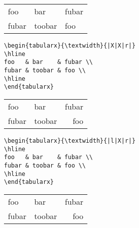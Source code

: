 \documentclass{article}
\begin{document}
\begin{tabularx}{\textwidth}{|l|X|X|}
	\hline
	foo   & bar    & fubar \\
	fubar & toobar & foo \\
	\hline
\end{tabularx}

\vspace{1cm}

\begin{verbatim}
\begin{tabularx}{\textwidth}{|X|X|r|}
\hline
foo   & bar    & fubar \\
fubar & toobar & foo \\
\hline
\end{tabularx}
\end{verbatim}

\begin{tabularx}{\textwidth}{|X|X|r|}
	\hline
	foo   & bar    & fubar \\
	fubar & toobar & foo \\
	\hline
\end{tabularx}

\vspace{1cm}

\begin{verbatim}
\begin{tabularx}{\textwidth}{|l|X|r|}
\hline
foo   & bar    & fubar \\
fubar & toobar & foo \\
\hline
\end{tabularx}
\end{verbatim}

\begin{tabularx}{\textwidth}{|l|X|r|}
	\hline
	foo   & bar    & fubar \\
	fubar & toobar & foo \\
	\hline
\end{tabularx}
\end{document}
